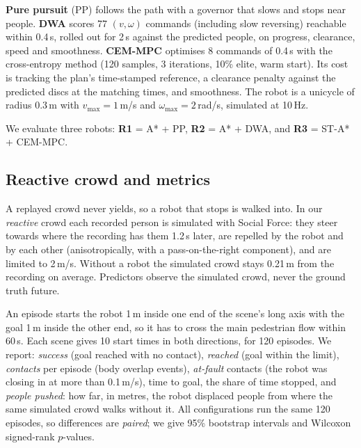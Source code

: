 \textbf{Pure pursuit} (PP) \cite{coulter1992} follows the path with a
governor that slows and stops near people. \textbf{DWA} \cite{fox1997}
scores 77 $(v,\omega)$ commands (including slow reversing) reachable within
0.4\,s, rolled out for 2\,s against the predicted people, on progress,
clearance, speed and smoothness. \textbf{CEM-MPC} optimises 8 commands of
0.4\,s with the cross-entropy method \cite{rubinstein2004} (120 samples,
3 iterations, 10\% elite, warm start). Its cost is tracking the plan's
time-stamped reference, a clearance penalty against the predicted discs at
the matching times, and smoothness. The robot is a unicycle of radius
0.3\,m with $v_{\max}=1$\,m/s and $\omega_{\max}=2$\,rad/s, simulated at
10\,Hz.

We evaluate three robots: \textbf{R1} = A* + PP, \textbf{R2} = A* + DWA, and
\textbf{R3} = ST-A* + CEM-MPC.

\subsection{Reactive crowd and metrics}
A replayed crowd never yields, so a robot that stops is walked into. In
our \emph{reactive} crowd each recorded person is simulated with Social
Force: they steer towards where the recording has them 1.2\,s later, are
repelled by the robot and by each other (anisotropically, with a
pass-on-the-right component), and are limited to 2\,m/s. Without a robot
the simulated crowd stays 0.21\,m from the recording on average.
Predictors observe the simulated crowd, never the ground truth future.

An episode starts the robot 1\,m inside one end of the scene's long axis
with the goal 1\,m inside the other end, so it has to cross the main
pedestrian flow within 60\,s. Each scene gives 10 start times in
both directions, for 120 episodes. We report: \emph{success} (goal reached
with no contact), \emph{reached} (goal within the limit), \emph{contacts}
per episode (body overlap events), \emph{at-fault} contacts (the robot was
closing in at more than 0.1\,m/s), time to goal, the share of time
stopped, and \emph{people pushed}: how far, in metres, the robot displaced
people from where the same simulated crowd walks without it. All
configurations run the same 120 episodes, so differences are
\emph{paired}; we give 95\% bootstrap intervals and Wilcoxon signed-rank
$p$-values.


